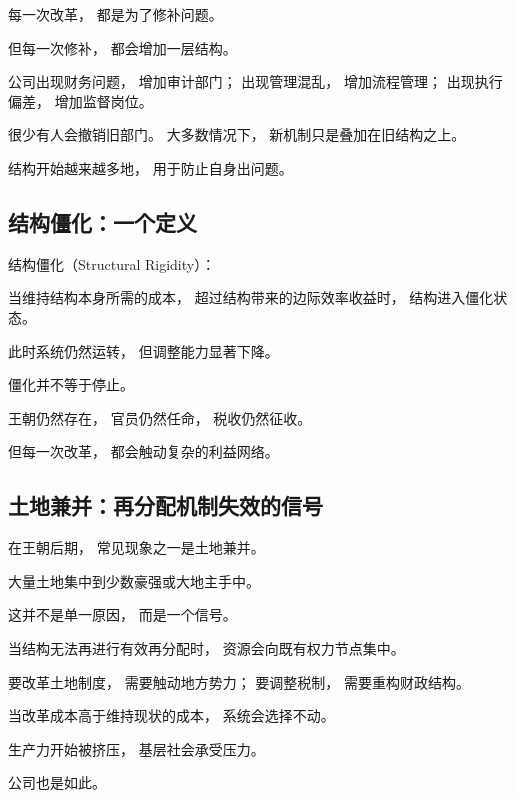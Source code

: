\documentclass[openany, a4paper, 12pt]{book}
\begin{document}
每一次改革，
都是为了修补问题。

但每一次修补，
都会增加一层结构。

\begin{examplebox}
	公司出现财务问题，
	增加审计部门；
	出现管理混乱，
	增加流程管理；
	出现执行偏差，
	增加监督岗位。
	
	很少有人会撤销旧部门。
	大多数情况下，
	新机制只是叠加在旧结构之上。
\end{examplebox}

结构开始越来越多地，
用于防止自身出问题。

\subsection{结构僵化：一个定义}

\begin{definitionbox}
	结构僵化（Structural Rigidity）：
	
	当维持结构本身所需的成本，
	超过结构带来的边际效率收益时，
	结构进入僵化状态。
	
	此时系统仍然运转，
	但调整能力显著下降。
\end{definitionbox}

僵化并不等于停止。

王朝仍然存在，
官员仍然任命，
税收仍然征收。

但每一次改革，
都会触动复杂的利益网络。

\subsection{土地兼并：再分配机制失效的信号}

在王朝后期，
常见现象之一是土地兼并。

大量土地集中到少数豪强或大地主手中。

这并不是单一原因，
而是一个信号。

\begin{readingnote}
	当结构无法再进行有效再分配时，
	资源会向既有权力节点集中。
\end{readingnote}

要改革土地制度，
需要触动地方势力；
要调整税制，
需要重构财政结构。

当改革成本高于维持现状的成本，
系统会选择不动。

生产力开始被挤压，
基层社会承受压力。

公司也是如此。
\end{document}
